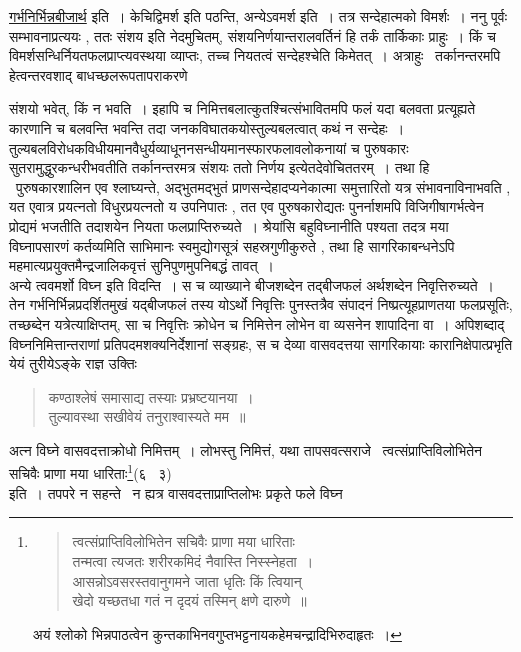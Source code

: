 \documentclass[11pt, openany]{book}
\begin{document}
\underline{गर्भनिर्भिन्नबीजार्थ} इति~। केचिद्विमर्श इति पठन्ति, अन्येऽवमर्श इति~। तत्र सन्देहात्मको विमर्शः~। ननु पूर्वः सम्भावनाप्रत्ययः , ततः संशय इति नेदमुचितम्, संशयनिर्णयान्तरालवर्तिनं हि तर्कं तार्किकाः प्राहुः~। किं च विमर्शसन्धिर्नियतफलप्राप्त्यवस्थया व्याप्तः, तच्च नियतत्वं सन्देहश्चेति किमेतत्~। अत्राहुः \textendash\ तर्कानन्तरमपि हेत्वन्तरवशाद् बाधच्छलरूपतापराकरणे

\newpage

\noindent
संशयो भवेत्, किं न भवति~। इहापि च निमित्तबलात्कुतश्चित्संभावितमपि फलं यदा बलवता प्रत्यूह्यते कारणानि च बलवन्ति भवन्ति तदा जनकविघातकयोस्तुल्यबलत्वात् कथं न सन्देहः~। तुल्यबलविरोधकविधीयमानवैधुर्यव्याधूननसन्धीयमानस्फारफलावलोकनायां च पुरुषकारः सुतरामुद्धुरकन्धरीभवतीति तर्कानन्तरमत्र संशयः ततो निर्णय इत्येतदेवोचिततरम्~। तथा हि \textendash\ पुरुषकारशालिन एव श्लाघ्यन्ते, अद्भुतमद्भुतं प्राणसन्देहादप्यनेकात्मा समुत्तारितो यत्र संभावनाविनाभवति , यत एवात्र प्रयत्नतो विधुरप्रयत्नतो य उपनिपातः , तत एव पुरुषकारोद्यतः पुनर्नाशमपि विजिगीषागर्भत्वेन प्रोद्यमं भजतीति तदाशयेन नियता फलप्राप्तिरुच्यते~। श्रेयांसि बहुविघ्नानीति पश्यता तदत्र मया विघ्नापसारणं कर्तव्यमिति साभिमानः स्वमुद्योगसूत्रं सहस्रगुणीकुरुते , तथा हि सागरिकाबन्धनेऽपि महमात्यप्रयुक्तमैन्द्रजालिकवृत्तं सुनिपुणमुपनिबद्धं तावत्~।\\

अन्ये त्ववमर्शो विघ्न इति विदन्ति~। स च व्याख्याने बीजशब्देन तद्बीजफलं अर्थशब्देन निवृत्तिरुच्यते~। तेन गर्भनिर्भिन्नप्रदर्शितमुखं यद्बीजफलं तस्य योऽर्थो निवृत्तिः पुनस्तत्रैव संपादनं निष्प्रत्यूहप्राणतया फलप्रसूतिः, तच्छब्देन यत्रेत्याक्षिप्तम्, सा च निवृत्तिः क्रोधेन च निमित्तेन लोभेन वा व्यसनेन शापादिना वा~। अपिशब्दाद् विघ्ननिमित्तान्तराणां प्रतिपदमशक्यनिर्देशानां सङ्ग्रहः, स च देव्या वासवदत्तया सागरिकायाः कारानिक्षेपात्प्रभृति येयं तुरीयेऽङ्के राज्ञ उक्तिः\textendash

\begin{quote}
{\qt कण्ठाश्लेषं समासाद्य तस्याः प्रभ्रष्टयानया~।\\
तुल्यावस्था सखीवेयं तनुराश्वास्यते मम~॥}
\end{quote}

\noindent
अत्न विघ्ने वासवदत्ताक्रोधो निमित्तम्~। लोभस्तु निमित्तं, यथा तापसवत्सराजे \textendash\ {\qt त्वत्संप्राप्तिविलोभितेन सचिवैः प्राणा मया धारिताः\renewcommand{\thefootnote}{*}\footnote{\begin{quote}
{\qt त्वत्संप्राप्तिविलोभितेन सचिवैः प्राणा मया धारिताः\\
तन्मत्वा त्यजतः शरीरकमिदं नैवास्ति निस्स्नेहता~।\\
आसन्नोऽवसरस्तवानुगमने जाता धृतिः किं त्वियान्\\
खेदो यच्छतधा गतं न दृदयं तस्मिन् क्षणे दारुणे~॥}
\end{quote}
अयं श्लोको भिन्नपाठत्वेन कुन्तकाभिनवगुप्तभट्टनायकहेमचन्द्रादिभिरुदाहृतः~।}}(६ \textendash\ ३)\\ इति~। तपपरे न सहन्ते \textendash\ न ह्यत्र वासवदत्ताप्राप्तिलोभः प्रकृते फले विघ्न \textendash
\end{document}
